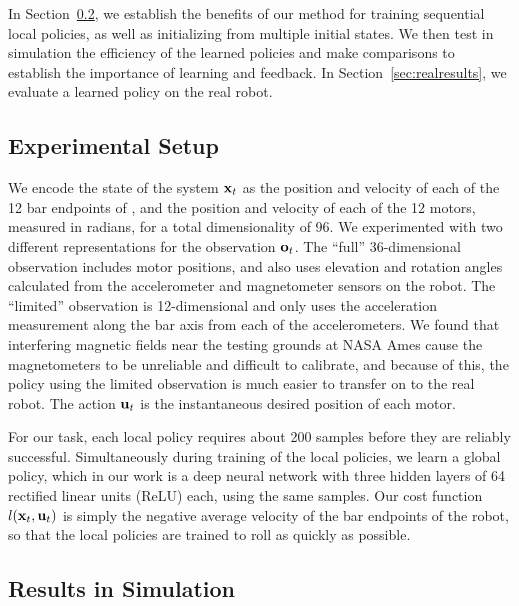 In Section~\ref{sec:simresults}, we establish the benefits of our method for
training sequential local policies, as well as initializing from multiple
initial states. We then test in simulation the efficiency of the learned
policies and make comparisons to establish the importance of learning and
feedback. In Section~\ref{sec:realresults}, we evaluate a learned policy on the
real robot.

\subsection{Experimental Setup}
\label{sec:setup}

We encode the state of the system $\mathbf{x}_t$ as the position and velocity of each of
the 12 bar endpoints of \SB{}, and the position and velocity of each of the 12
motors, measured in radians, for a total dimensionality of 96. We experimented
with two different representations for the observation $\mathbf{o}_t$. The ``full''
36-dimensional observation includes motor positions, and also uses elevation and
rotation angles calculated from the accelerometer and magnetometer sensors on
the robot. The ``limited'' observation is 12-dimensional and only uses the
acceleration measurement along the bar axis from each of the accelerometers. We
found that interfering magnetic fields near the testing grounds at NASA
Ames cause the magnetometers to be unreliable and difficult to calibrate, and
because of this, the policy using the limited observation is much easier to
transfer on to the real robot. The action $\mathbf{u}_t$ is the instantaneous desired position 
of each motor. 

For our task, each local policy requires about 200 samples before they are
reliably successful. Simultaneously during training of the local policies, we
learn a global policy, which in our work is a deep neural network with three
hidden layers of 64 rectified linear units (ReLU) each, using the same samples.
Our cost function $l(\mathbf{x}_t,\mathbf{u}_t)$ is simply the negative average velocity
of the bar endpoints of the robot, so that the local policies are trained to
roll as quickly as possible.

\subsection{Results in Simulation}
\label{sec:simresults}

